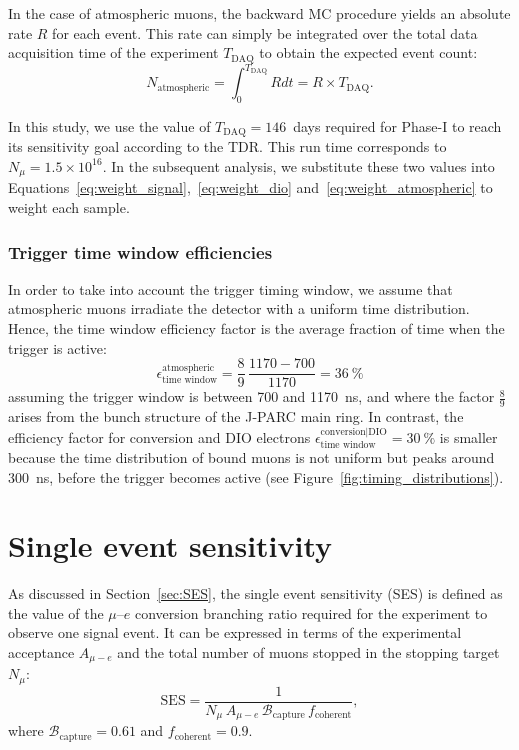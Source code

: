 In the case of atmospheric muons, the backward MC procedure yields an absolute
rate $R$ for each event. This rate can simply be integrated over the total
data acquisition time of the experiment $T_\mathrm{DAQ}$ to obtain the expected
event count:
\begin{equation}\label{eq:weight_atmospheric}
N_\mathrm{atmospheric} = \int_0^{T_\mathrm{DAQ}} R dt = R \times T_\mathrm{DAQ}.
\end{equation}

In this study, we use the value of $T_\mathrm{DAQ} = 146$~days required for
Phase-I to reach its sensitivity goal according to the TDR. This run time
corresponds to $N_\mu = 1.5 \times 10^{16}$. In the subsequent analysis, we
substitute these two values into
Equations~\ref{eq:weight_signal},~\ref{eq:weight_dio}
and~\ref{eq:weight_atmospheric} to weight each sample.



\subsubsection{Trigger time window efficiencies}
In order to take into account the trigger timing window, we assume that
atmospheric muons irradiate the detector with a uniform time distribution.
Hence, the time window efficiency factor is the average fraction of time when
the trigger is active:
$$
\epsilon_\text{time window}^\mathrm{atmospheric} =
\frac{8}{9}\,\frac{1170 - 700}{1170} = \SI{36}{\percent}
$$
assuming the trigger window is between 700 and \SI{1170}{\ns}, and where the
factor $\frac{8}{9}$ arises from the bunch structure of the J-PARC main ring. In
contrast, the efficiency factor for conversion and DIO electrons
$\epsilon_\text{time window}^\text{conversion|DIO} = \SI{30}{\percent}$ is
smaller because the time distribution of bound muons is not uniform but peaks
around \SI{300}{\ns}, before the trigger becomes active (see
Figure~\ref{fig:timing_distributions}).



\section{Single event sensitivity}
As discussed in Section~\ref{sec:SES}, the single event sensitivity (SES) is
defined as the value of the $\mu$--$e$ conversion branching ratio required for
the experiment to observe one signal event. It can be expressed in terms of the
experimental acceptance $A_{\mu-e}$ and the total number of muons stopped in the
stopping target $N_\mu$:
\begin{equation}
\mathrm{SES} = 
\frac{1}{N_\mu\,A_{\mu-e}\,\mathcal{B}_\mathrm{capture}\,f_\mathrm{coherent}},
\end{equation}
where $\mathcal{B}_\mathrm{capture} = 0.61$ and $f_\mathrm{coherent} = 0.9$.


